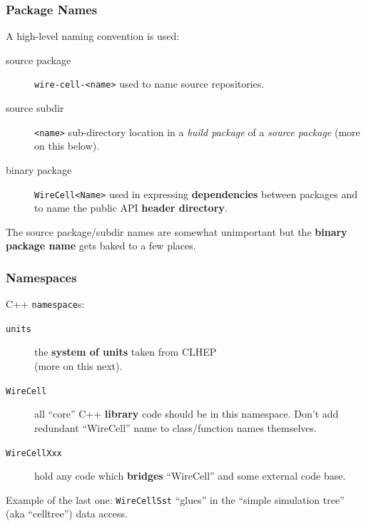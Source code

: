 \documentclass[xcolor=dvipsnames]{beamer}
\begin{document}
\begin{frame}
  \frametitle{Package Names}

  A high-level naming convention is used:

  \begin{description}
  \item[source package] \texttt{wire-cell-<name>} used to name source repositories.
  \item[source subdir] \texttt{<name>} sub-directory location in a \textit{build
    package} of a \textit{source package} (more on this below).
  \item[binary package] \texttt{WireCell<Name>} used in expressing
    \textbf{dependencies} between packages and to name the public API
    \textbf{header directory}.
  \end{description}

  The source package/subdir names are somewhat unimportant but the
  \textbf{binary package name} gets baked to a few places.
\end{frame}

\begin{frame}
  \frametitle{Namespaces}

  C++ \texttt{namespace}s:
  \begin{description}
  \item[\texttt{units}]  the \textbf{system of units} taken from CLHEP \\
    (more on this next).
  \item[\texttt{WireCell}] all ``core'' C++ \textbf{library} code
    should be in this namespace.
    Don't add redundant ``WireCell'' name to class/function names
    themselves.
  \item[\texttt{WireCellXxx}] hold any code which \textbf{bridges}
    ``WireCell'' and some external code base.
  \end{description}

  Example of the last one: \texttt{WireCellSst} ``glues'' in the
  ``simple simulation tree'' (aka ``celltree'') data access.

\end{frame}
\end{document}
